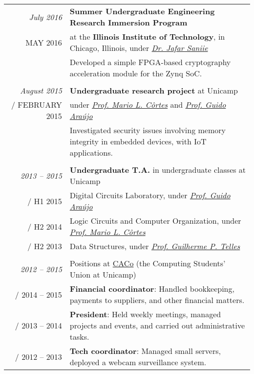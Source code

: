 \documentclass[a4paper,10pt]{article}
\makeatletter
\def\fakesc#1{%
  \begingroup%
  \xdef\fake@name{\csname\curr@fontshape/\f@size\endcsname}%
  \fontsize{\fontdimen8\fake@name}{\baselineskip}\selectfont%
  \uppercase{#1}%
  \endgroup%
}
\renewcommand{\textsc}{\fakesc}
\makeatother
\begin{document}
\begin{tabularx}{\textwidth}{r|X}

  \emph{July 2016} & \textbf{Summer Undergraduate Engineering Research Immersion Program}\\
 \textsc{May 2016}  & at the \textbf{Illinois Institute of Technology}, in Chicago, Illinois, under \href{https://engineering.iit.edu/faculty/jafar-saniie}{\emph{Dr. Jafar Saniie}}\\
                     & \footnotesize {Developed a simple FPGA-based cryptography acceleration module for the Zynq SoC.}\\
  \multicolumn{2}{c}{} \\


  \emph{August 2015} & \textbf{Undergraduate research project} at Unicamp\\
  \textsc{February 2015} & under \href{http://www.ic.unicamp.br/~cortes/}{\emph{Prof. Mario L. Côrtes}} and \href{http://guidoaraujo.wordpress.com/}{\emph{Prof. Guido Araújo}}\\
                     & \footnotesize {Investigated security issues involving memory integrity in embedded devices, with IoT applications.}\\
  \multicolumn{2}{c}{} \\

  \emph{2013 -- 2015} & \textbf{Undergraduate T.A.} in undergraduate classes at Unicamp \\
  \textsc{H1 2015} & \footnotesize{Digital Circuits Laboratory, under \href{http://guidoaraujo.wordpress.com/}{\emph{Prof. Guido Araújo}}}\\
  \textsc{H2 2014} & \footnotesize{Logic Circuits and Computer Organization, under \href{http://www.ic.unicamp.br/~cortes/}{\emph{Prof. Mario L. Côrtes}}}\\
  \textsc{H2 2013} & \footnotesize{Data Structures, under \href{http://ic.unicamp.br/~gpt/}{\emph{Prof. Guilherme P. Telles}}}\\
  \multicolumn{2}{c}{}\\

  \emph{2012 -- 2015} & Positions at \href{http://www.caco.ic.unicamp.br}{CACo} \footnotesize{(the Computing Students' Union at Unicamp)} \\
  \textsc{2014 -- 2015} & \footnotesize{\textbf{Financial coordinator}: Handled bookkeeping, payments to suppliers, and other financial matters.}\\
  \textsc{2013 -- 2014} & \footnotesize{\textbf{President}: Held weekly meetings, managed projects and events, and carried out administrative tasks.}\\
  \textsc{2012 -- 2013} & \footnotesize{\textbf{Tech coordinator}: Managed small servers, deployed a webcam surveillance system.}\\

\end{tabularx}
\end{document}
